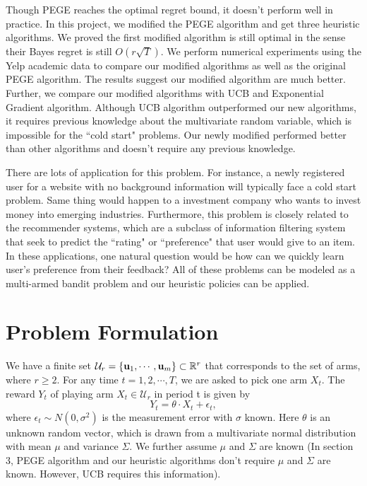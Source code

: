 \documentclass{article}
\theoremstyle{plain}
\theoremstyle{definition}
\begin{document}
Though PEGE reaches the optimal regret bound, it doesn't perform well in practice. In this project, we modified the PEGE algorithm and get three heuristic algorithms. We proved the first modified algorithm is still optimal in the sense their Bayes regret is still $O(r\sqrt{T})$. We perform numerical experiments using the Yelp academic data to compare our modified algorithms as well as the original PEGE algorithm. The results suggest our modified algorithm are much better. Further, we compare our modified algorithms with UCB and Exponential Gradient algorithm. Although UCB algorithm outperformed our new algorithms, it requires previous knowledge about the multivariate random variable, which is impossible for the ``cold start" problems. Our newly modified performed better than other algorithms and doesn't require any previous knowledge.

There are lots of application for this problem. For instance, a newly registered user for a website with no background information will typically face a cold start problem. Same thing would happen to a investment company who wants to invest money into emerging industries. Furthermore, this problem is closely related to the recommender systems, which are a subclass of information filtering system that seek to predict the ``rating" or ``preference" that user would give to an item. In these applications, one natural question would be how can we quickly learn user's preference from their feedback? All of these problems can be modeled as a multi-armed bandit problem and our heuristic policies can be applied.





\section{Problem Formulation}
We have a finite set $\mathcal{U}_{r}=\{\bold{u}_{1},\cdots,\bold{u}_{m}\}\subset \mathbb{R}^{r}$ that corresponds to the set of arms, where $r\geq 2$. For any time $t=1,2,\cdots,T$, we are asked to pick one arm $X_{t}$. The reward $Y_{t}$ of playing arm $X_{t}\in \mathcal{U}_{r}$ in period t is given by
\begin{equation}
Y_{t} = \theta \cdot X_{t} + \epsilon_{t}, \nonumber
\end{equation}
where $\epsilon_{t}\sim N(0,\sigma^{2})$ is the measurement error with $\sigma$ known. Here $\theta$ is an unknown random vector, which is drawn from a multivariate normal distribution with mean $\mu$ and variance $\Sigma$. We further assume $\mu$ and $\Sigma$ are known (In section 3, PEGE algorithm and our heuristic algorithms don't require $\mu$ and $\Sigma$ are known. However, UCB requires this information).
\end{document}
